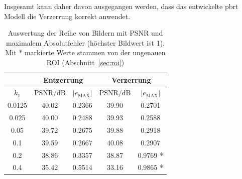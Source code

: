 Insgesamt kann daher davon ausgegangen werden, dass das entwickelte pbrt Modell die Verzerrung korrekt anwendet.

\begin{table}
	\centering
\begin{tabular}{|c|c|c|c|c|}
	\hline 
	\rule[-1ex]{0pt}{2.5ex}  & \multicolumn{2}{c|}{Entzerrung} & \multicolumn{2}{c|}{Verzerrung}  \\ 
	\hline 
	\rule[-1ex]{0pt}{2.5ex} $k_1$ & $\text{PSNR}/\text{dB}$ & $|e_\text{MAX}|$ & $\text{PSNR}/\text{dB}$ & $|e_\text{MAX}|$ \\ 
	\hline 
	\rule[-1ex]{0pt}{2.5ex} 0.0125 & 40.02 & 0.2366 & 39.90 & 0.2701 \\ 
	\hline 
	\rule[-1ex]{0pt}{2.5ex} 0.025 & 40.00 & 0.2488 & 39.93 & 0.2588 \\ 
	\hline 
	\rule[-1ex]{0pt}{2.5ex} 0.05 & 39.72 & 0.2675 & 39.88 & 0.2918 \\ 
	\hline 
	\rule[-1ex]{0pt}{2.5ex} 0.1 & 39.59 & 0.2667 & 40.08 & 0.2907 \\ 
	\hline 
	\rule[-1ex]{0pt}{2.5ex} 0.2 & 38.86 & 0.3357 & 38.87 & 0.9769 * \\ 
	\hline 
	\rule[-1ex]{0pt}{2.5ex} 0.4 & 35.42 & 0.5514 & 33.16 & 0.9865 * \\ 
	\hline 
\end{tabular} 

\caption{Auswertung der Reihe von Bildern mit PSNR und maximalem Absolutfehler (höchster Bildwert ist 1). Mit * markierte Werte stammen von der ungenauen ROI (Abschnitt~\ref{sec:roi})}
\label{tbl:comparison}
\end{table}










 
